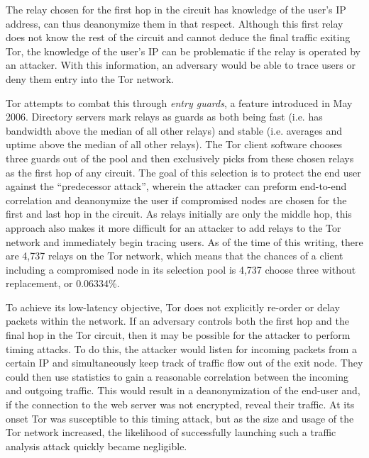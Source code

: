 \documentclass[journal]{IEEEtran}
\begin{document}

The relay chosen for the first hop in the circuit has knowledge of the user's IP address, can thus deanonymize them in that respect. Although this first relay does not know the rest of the circuit and cannot deduce the final traffic exiting Tor, the knowledge of the user's IP can be problematic if the relay is operated by an attacker. With this information, an adversary would be able to trace users or deny them entry into the Tor network.

Tor attempts to combat this through \textit{entry guards}, a feature introduced in May 2006. Directory servers mark relays as guards as both being fast (i.e. has bandwidth above the median of all other relays) and stable (i.e. averages and uptime above the median of all other relays). The Tor client software chooses three guards out of the pool and then exclusively picks from these chosen relays as the first hop of any circuit.\cite{Xin2009} The goal of this selection is to protect the end user against the ``predecessor attack'', wherein the attacker can preform end-to-end correlation and deanonymize the user if compromised nodes are chosen for the first and last hop in the circuit.\cite{Wright2004} As relays initially are only the middle hop, this approach also makes it more difficult for an attacker to add relays to the Tor network and immediately begin tracing users. As of the time of this writing, there are 4,737 relays on the Tor network, which means that the chances of a client including a compromised node in its selection pool is 4,737 choose three without replacement, or 0.06334\%.

To achieve its low-latency objective, Tor does not explicitly re-order or delay packets within the network.\cite{McCoy2008} If an adversary controls both the first hop and the final hop in the Tor circuit, then it may be possible for the attacker to perform timing attacks. To do this, the attacker would listen for incoming packets from a certain IP and simultaneously keep track of traffic flow out of the exit node. They could then use statistics to gain a reasonable correlation between the incoming and outgoing traffic. This would result in a deanonymization of the end-user and, if the connection to the web server was not encrypted, reveal their traffic. At its onset Tor was susceptible to this timing attack, but as the size and usage of the Tor network increased, the likelihood of successfully launching such a traffic analysis attack quickly became negligible.\cite{Xin2009}
\end{document}
